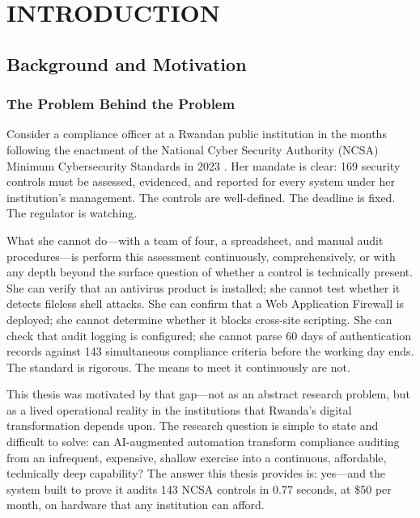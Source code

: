 \documentclass[12pt,oneside]{report}
\begin{document}
\newpage
{}
\setcounter{page}{1}

\chapter{INTRODUCTION}

\section{Background and Motivation}

\subsection{The Problem Behind the Problem}

Consider a compliance officer at a Rwandan public institution in the months following the enactment of the National Cyber Security Authority (NCSA) Minimum Cybersecurity Standards in 2023 \cite{ncsa2023}. Her mandate is clear: 169 security controls must be assessed, evidenced, and reported for every system under her institution's management. The controls are well-defined. The deadline is fixed. The regulator is watching.

What she cannot do—with a team of four, a spreadsheet, and manual audit procedures—is perform this assessment continuously, comprehensively, or with any depth beyond the surface question of whether a control is technically present. She can verify that an antivirus product is installed; she cannot test whether it detects fileless shell attacks. She can confirm that a Web Application Firewall is deployed; she cannot determine whether it blocks cross-site scripting. She can check that audit logging is configured; she cannot parse 60 days of authentication records against 143 simultaneous compliance criteria before the working day ends. The standard is rigorous. The means to meet it continuously are not.

This thesis was motivated by that gap—not as an abstract research problem, but as a lived operational reality in the institutions that Rwanda's digital transformation depends upon. The research question is simple to state and difficult to solve: can AI-augmented automation transform compliance auditing from an infrequent, expensive, shallow exercise into a continuous, affordable, technically deep capability? The answer this thesis provides is: yes—and the system built to prove it audits 143 NCSA controls in 0.77 seconds, at \$50 per month, on hardware that any institution can afford.
\end{document}
